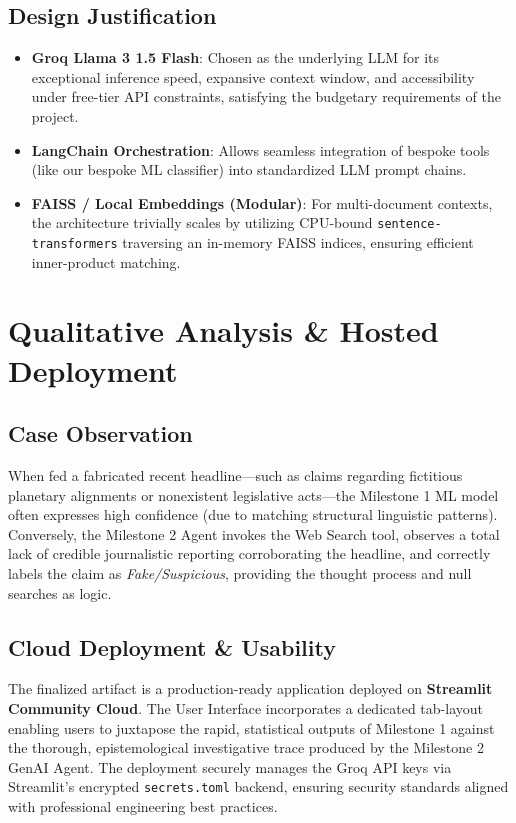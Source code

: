 \documentclass[12pt, a4paper]{article}
\begin{document}
\subsection{Design Justification}
\begin{itemize}
    \item \textbf{Groq Llama 3 1.5 Flash}: Chosen as the underlying LLM for its exceptional inference speed, expansive context window, and accessibility under free-tier API constraints, satisfying the budgetary requirements of the project.
    \item \textbf{LangChain Orchestration}: Allows seamless integration of bespoke tools (like our bespoke ML classifier) into standardized LLM prompt chains.
    \item \textbf{FAISS / Local Embeddings (Modular)}: For multi-document contexts, the architecture trivially scales by utilizing CPU-bound \texttt{sentence-transformers} traversing an in-memory FAISS indices, ensuring efficient inner-product matching.
\end{itemize}

\section{Qualitative Analysis \& Hosted Deployment}

\subsection{Case Observation}
When fed a fabricated recent headline—such as claims regarding fictitious planetary alignments or nonexistent legislative acts—the Milestone 1 ML model often expresses high confidence (due to matching structural linguistic patterns). Conversely, the Milestone 2 Agent invokes the Web Search tool, observes a total lack of credible journalistic reporting corroborating the headline, and correctly labels the claim as \textit{Fake/Suspicious}, providing the thought process and null searches as logic.

\subsection{Cloud Deployment \& Usability}
The finalized artifact is a production-ready application deployed on \textbf{Streamlit Community Cloud}. The User Interface incorporates a dedicated tab-layout enabling users to juxtapose the rapid, statistical outputs of Milestone 1 against the thorough, epistemological investigative trace produced by the Milestone 2 GenAI Agent. The deployment securely manages the Groq API keys via Streamlit's encrypted \texttt{secrets.toml} backend, ensuring security standards aligned with professional engineering best practices.
\end{document}
